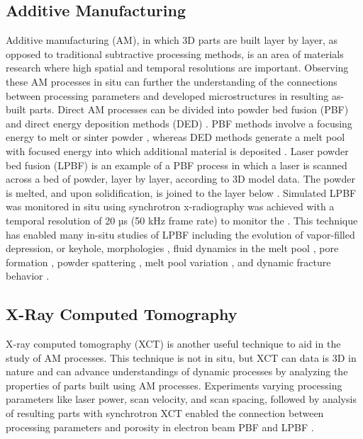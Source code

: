 \subsection{Additive Manufacturing}
Additive manufacturing (AM), in which 3D parts are built
layer by layer, as opposed to
traditional subtractive processing methods, is an area of materials
research where high spatial and temporal resolutions are important.
Observing these AM processes in situ can further the understanding of the
connections between processing parameters and developed microstructures
in resulting as-built parts. Direct AM processes can be divided into
powder bed fusion (PBF) and direct energy deposition methods (DED)
\cite{Sames2016, Debroy2018}. PBF methods involve a focusing energy to
melt or sinter powder \cite{Gibson2015pbf, Sun2017}, whereas DED methods
generate a melt pool with focused energy into which additional material is
deposited \cite{Gibson2015ded}. Laser powder bed fusion (LPBF) is an
example of a PBF process in which a laser is scanned across a bed of
powder, layer by layer, according to 3D model data. The powder is melted,
and upon solidification, is joined to the layer below \cite{King2015}.
Simulated LPBF was monitored in situ using synchrotron x-radiography was
achieved with a temporal resolution of 20 µs (50 kHz frame rate) to
monitor the \cite{Zhao2017}. This technique has enabled many in-situ
studies of LPBF including the evolution of vapor-filled depression, or
keyhole, morphologies \cite{Cunningham2019}, fluid dynamics in the melt
pool \cite{Leung2018nat, Guo2020}, pore formation \cite{Martin2019}, powder
spattering \cite{Guo2018}, melt pool variation \cite{Guo2019}, and dynamic
fracture behavior \cite{Parab2019}.

\subsection{X-Ray Computed Tomography}
X-ray computed tomography (XCT)
is another useful technique to aid in the study of AM processes. This
technique is not in situ, but XCT can data is 3D in nature and can advance
understandings of dynamic processes by analyzing the properties of parts
built using AM processes. Experiments varying processing parameters like
laser power, scan velocity, and scan spacing, followed by analysis of
resulting parts with synchrotron XCT enabled the connection between
processing parameters and porosity in electron beam PBF
\cite{Cunningham2016} and LPBF \cite{Cunningham2017}.

